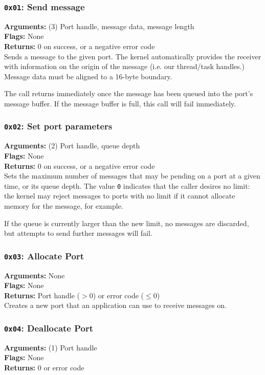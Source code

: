 \documentclass[11pt]{article}
\begin{document}
\subsubsection{{\tt 0x01}: Send message}
\textbf{Arguments:} (3) Port handle, message data, message length \\
\textbf{Flags:} None \\
\textbf{Returns:} 0 on success, or a negative error code \\

Sends a message to the given port. The kernel automatically provides the receiver with information on the origin of the message (i.e. our thread/task handles.) Message data must be aligned to a 16-byte boundary.

The call returns immediately once the message has been queued into the port's message buffer. If the message buffer is full, this call will fail immediately.

\subsubsection{{\tt 0x02}: Set port parameters}
\textbf{Arguments:} (2) Port handle, queue depth \\
\textbf{Flags:} None \\
\textbf{Returns:} 0 on success, or a negative error code \\

Sets the maximum number of messages that may be pending on a port at a given time, or its queue depth. The value \texttt{0} indicates that the caller desires no limit: the kernel may reject messages to ports with no limit if it cannot allocate memory for the message, for example.

If the queue is currently larger than the new limit, no messages are discarded, but attempts to send further messages will fail.

\subsubsection{{\tt 0x03}: Allocate Port}
\textbf{Arguments:} None \\
\textbf{Flags:} None \\
\textbf{Returns:} Port handle ($>0$) or error code ($\leq0$) \\

Creates a new port that an application can use to receive messages on.

\subsubsection{{\tt 0x04}: Deallocate Port}
\textbf{Arguments:} (1) Port handle \\
\textbf{Flags:} None \\
\textbf{Returns:} 0 or error code \\
\end{document}
